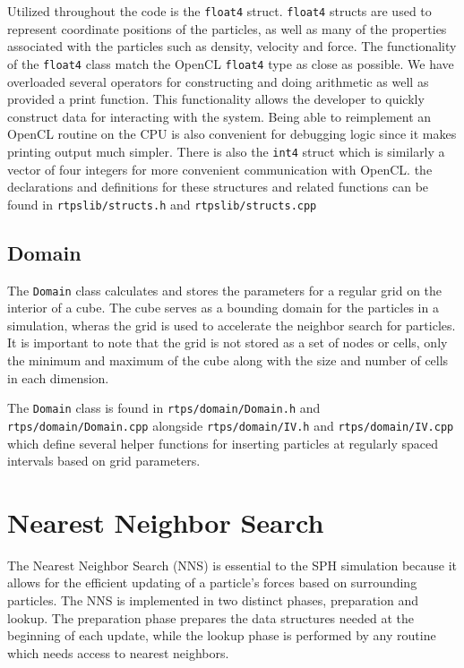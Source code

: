 Utilized throughout the code is the \verb|float4| struct. \verb|float4| structs are used
to represent coordinate positions of the particles, as well as many of the
properties associated with the particles such as density, velocity and force.
The functionality of the \verb|float4| class match the OpenCL \verb|float4| type as close
as possible. We have overloaded several operators for constructing and doing
arithmetic as well as provided a print function. This functionality allows the
developer to quickly construct data for interacting with the system. Being able
to reimplement an OpenCL routine on the CPU is also convenient for debugging
logic since it makes printing output much simpler. 
There is also the \verb|int4| struct which is similarly a vector of four integers
for more convenient communication with OpenCL.
the declarations and definitions for these structures and related functions can
be found in \verb|rtpslib/structs.h| and \verb|rtpslib/structs.cpp|


\subsection{Domain}

The \verb|Domain| class calculates and stores the parameters for a regular grid
on the interior of a cube. The cube serves as a bounding domain for the
particles in a simulation, wheras the grid is used to accelerate the neighbor
search for particles. It is important to note that the grid is not stored as a
set of nodes or cells, only the minimum and maximum of the cube along with the
size and number of cells in each dimension.

The \verb|Domain| class is found in \verb|rtps/domain/Domain.h| and
\verb|rtps/domain/Domain.cpp| alongside \verb|rtps/domain/IV.h| and
\verb|rtps/domain/IV.cpp| which define several helper functions for inserting
particles at regularly spaced intervals based on grid parameters.


\section{Nearest Neighbor Search}
The Nearest Neighbor Search (NNS) is essential to the SPH simulation because it
allows for the efficient updating of a particle's forces based on surrounding
particles. The NNS is implemented in two distinct phases, preparation and
lookup. The preparation phase prepares the data structures needed at the
beginning of each update, while the lookup phase is performed by any routine
which needs access to nearest neighbors.

